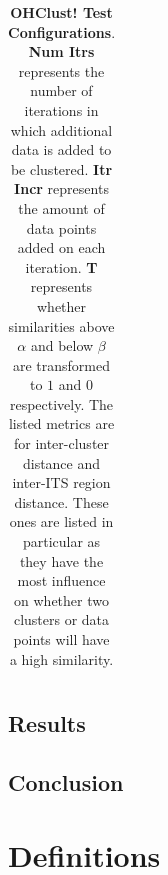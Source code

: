 \documentclass[12pt]{ucthesis}
\begin{document}
\begin{table}[t]
{\begin{tabular} {| c | c | c | c | c | c | c | c | c |}
      \hline
      \end{tabular}
      }
      \caption{\textbf{OHClust! Test Configurations}. \textbf{Num Itrs}
               represents the number of iterations in which additional data is
               added to be clustered. \textbf{Itr Incr} represents the amount
               of data points added on each iteration. \textbf{T} represents
               whether similarities above $\alpha$ and below $\beta$ are
               transformed to $1$ and $0$ respectively. The listed metrics are
               for inter-cluster distance and inter-ITS region distance. These
               ones are listed in particular as they have the most influence on
               whether two clusters or data points will have a high similarity.}
      \label{tab:ohclust_configs}
      \end{table}


   \section{Results}\label{sec:results}


   \section{Conclusion}\label{sec:conclusion}

\appendix

\chapter{Definitions}\label{app:definitions}
\end{document}
